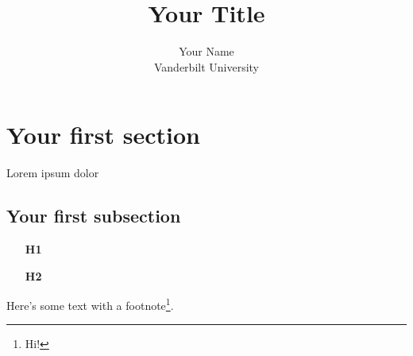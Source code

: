 \documentclass[a4paper]{article}
\begin{document}
\doublespacing
\title{Your Title
}

\author{Your Name \\ Vanderbilt University \date{}}

\maketitle

  
\doublespacing
{}


\section{Your first section}

Lorem ipsum dolor

\subsection{Your first subsection}


\begin{itemize}
\item[\textbf{H1}]  
\item[\textbf{H2}] 
\end{itemize}
 


Here's some text with a footnote\footnote{Hi!}.





\newpage
\singlespacing

%
\end{document}
